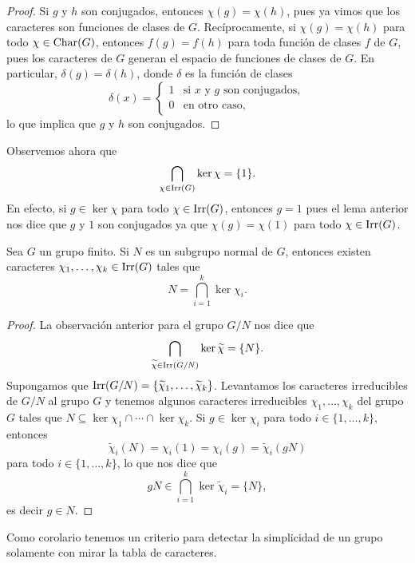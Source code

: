 \begin{proof}
    Si $g$ y $h$ son conjugados, entonces $\chi(g)=\chi(h)$, pues ya vimos que los caracteres son funciones de clases de $G$. 
    Recíprocamente, si $\chi(g)=\chi(h)$ para todo $\chi\in\operatorname{Char}(G)$, entonces
    $f(g)=f(h)$ para toda función de clases $f$ de $G$, 
    pues los caracteres de $G$ generan el espacio de funciones de clases de $G$. En particular, 
    $\delta(g)=\delta(h)$, donde $\delta$ es la función de clases 
    \[
    \delta(x)=\begin{cases}
    1 & \text{si $x$ y $g$ son conjugados},\\
    0 & \text{en otro caso},
    \end{cases}
    \]
    lo que implica que $g$ y $h$ son conjugados. 
\end{proof}

Observemos ahora que 
\begin{equation}
\label{eq:kernels}
\bigcap_{\chi\in\operatorname{Irr}(G)}\ker\chi=\{1\}.
\end{equation}
En efecto, si $g\in\ker\chi$ para todo $\chi\in\operatorname{Irr}(G)$, entonces $g=1$ pues
el lema anterior nos dice que $g$ y $1$ son conjugados ya que 
$\chi(g)=\chi(1)$ para todo $\chi\in\operatorname{Irr}(G)$.

\begin{proposition}
    Sea $G$ un grupo finito. 
    Si $N$ es un subgrupo normal de $G$, entonces existen caracteres 
    $\chi_1,\dots,\chi_k\in\operatorname{Irr}(G)$ 
    tales que
    \[
    N=\bigcap_{i=1}^k\ker\chi_i.
    \]
\end{proposition}

\begin{proof}
    La observación anterior para el grupo $G/N$ nos dice que 
    \[
    \bigcap_{\widetilde{\chi}\in\operatorname{Irr}(G/N)}\ker\widetilde{\chi}=\{N\}.
    \]
    Supongamos que $\operatorname{Irr}(G/N)=\{\widetilde{\chi}_1,\dots,\widetilde{\chi}_k\}$. 
    Levantamos los caracteres irreducibles de $G/N$ al grupo $G$ 
    y tenemos algunos caracteres irreducibles $\chi_1,\dots,\chi_k$ 
    del grupo $G$ tales que
    $N\subseteq\ker\chi_1\cap\cdots\cap\ker\chi_k$. 
    Si $g\in\ker\chi_i$ para todo $i\in\{1,\dots,k\}$, entonces
    \[
    \widetilde{\chi}_i(N)=\chi_i(1)=\chi_i(g)=\widetilde{\chi}_i(gN)
    \]
    para todo $i\in\{1,\dots,k\}$, lo que nos dice que 
    \[
    gN\in\bigcap_{i=1}^k\ker\widetilde{\chi}_i=\{N\},
    \]
    es decir $g\in N$. 
\end{proof}

Como corolario tenemos un criterio para detectar 
la simplicidad de un grupo solamente con mirar la tabla de caracteres. 

